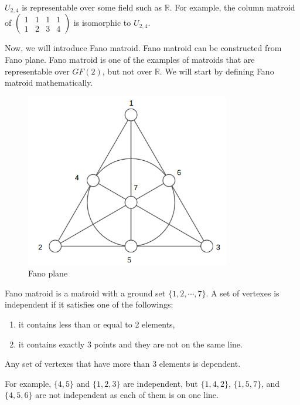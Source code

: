 $U_{2, 4}$ is representable over some field such as $\mathbb{R}$.
For example, the column matroid of $\begin{pmatrix}
1 & 1 & 1 & 1 \\
1 & 2 & 3 & 4 
\end{pmatrix}$ is isomorphic to $U_{2, 4}$.


Now, we will introduce Fano matroid.
Fano matroid can be constructed from Fano plane.
Fano matroid is one of the examples of matroids that are representable over $GF(2)$, but not over $\mathbb{R}$.
We will start by defining Fano matroid mathematically.

\begin{figure}
  \centering
    \includegraphics[width=0.8\textwidth,natwidth=610,natheight=642]{Fano_plane.png}
    \caption{Fano plane}
  \label{fig:test}
\end{figure}

\begin{defn}
Fano matroid is a matroid with a ground set $\{ 1, 2, \cdots, 7 \}$. 
A set of vertexes is independent if it satisfies one of the followings:
\begin{enumerate}
\item it contains less than or equal to 2 elements,
\item it contains exactly 3 points and they are not on the same line.
\end{enumerate}
Any set of vertexes that have more than 3 elements is dependent.
\end{defn}

For example, $\{4, 5\}$ and $\{ 1, 2, 3 \}$ are independent, but $\{ 1, 4, 2 \}$, $\{1, 5, 7\}$, and $\{4, 5, 6 \}$ are not independent as each of them is on one line.

